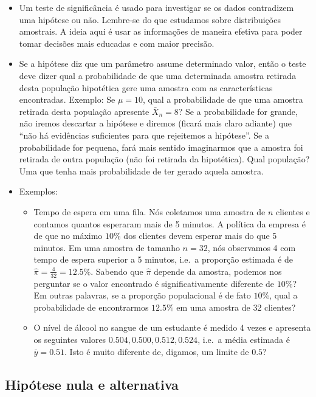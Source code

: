 \documentclass[]{article}
\providecommand{\tightlist}{%
  \setlength{\itemsep}{0pt}\setlength{\parskip}{0pt}}
\begin{document}
\begin{itemize}
\item
  Um teste de significância é usado para investigar se os dados
  contradizem uma hipótese ou não. Lembre-se do que estudamos sobre
  distribuições amostrais. A ideia aqui é usar as informações de maneira
  efetiva para poder tomar decisões mais educadas e com maior precisão.
\item
  Se a hipótese diz que um parâmetro assume determinado valor, então o
  teste deve dizer qual a probabilidade de que uma determinada amostra
  retirada desta população hipotética gere uma amostra com as
  características encontradas. Exemplo: Se \(\mu = 10\), qual a
  probabilidade de que uma amostra retirada desta população apresente
  \(\bar{X}_n = 8\)? Se a probabilidade for grande, não iremos descartar
  a hipótese e diremos (ficará mais claro adiante) que ``não há
  evidências suficientes para que rejeitemos a hipótese''. Se a
  probabilidade for pequena, fará mais sentido imaginarmos que a amostra
  foi retirada de outra população (não foi retirada da hipotética). Qual
  população? Uma que tenha mais probabilidade de ter gerado aquela
  amostra.
\item
  Exemplos:

  \begin{itemize}
  \tightlist
  \item
    Tempo de espera em uma fila. Nós coletamos uma amostra de \(n\)
    clientes e contamos quantos esperaram mais de 5 minutos. A política
    da empresa é de que no máximo \(10\%\) dos clientes devem esperar
    mais do que 5 minutos. Em uma amostra de tamanho \(n=32\), nós
    observamos 4 com tempo de espera superior a 5 minutos, i.e.~a
    proporção estimada é de \(\hat{\pi} = \frac{4}{32} = 12.5\%\).
    Sabendo que \(\hat{\pi}\) depende da amostra, podemos nos perguntar
    se o valor encontrado é significativamente diferente de \(10\%\)? Em
    outras palavras, se a proporção populacional é de fato \(10\%\),
    qual a probabilidade de encontrarmos \(12.5\%\) em uma amostra de 32
    clientes?
  \item
    O nível de álcool no sangue de um estudante é medido 4 vezes e
    apresenta os seguintes valores \(0.504,0.500,0.512,0.524\), i.e.~a
    média estimada é \(\bar{y}=0.51\). Isto é muito diferente de,
    digamos, um limite de \(0.5\)?
  \end{itemize}
\end{itemize}

\subsection{Hipótese nula e
alternativa}\label{hipotese-nula-e-alternativa}
\end{document}
